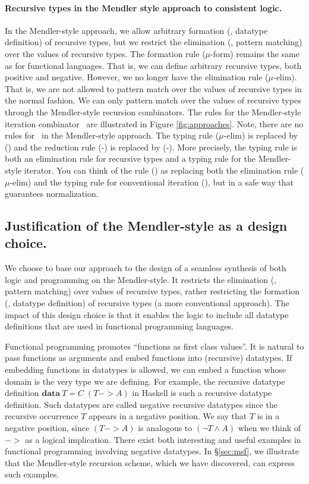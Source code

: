 \paragraph{Recursive types in the Mendler style approach to consistent logic.}
In the Mendler-style approach, we allow arbitrary formation
(\ie, datatype definition) of recursive types, but we restrict
the elimination (\ie, pattern matching) over the values of recursive types. 
The formation rule {\small($\mu$-form)} remains the same as
for functional languages. That is, we can define arbitrary recursive types,
both positive and negative. However, we no longer have the elimination
rule {\small($\mu$-elim)}. That is, we are not allowed to pattern match over
the values of recursive types in the normal fashion. We can only pattern match
over the values of recursive types through the Mendler-style recursion
combinators. The rules for the Mendler-style iteration combinator \MIt\
are illustrated in Figure \ref{fig:approaches}.
Note, there are no rules for \unIn\ in the Mendler-style approach.
The typing rule {\small($\mu$-elim)} is replaced by {\small(\MIt)} and
the reduction rule {\small(\unIn-\In)} is replaced by {\small(\MIt-\In)}.
More precisely, the typing rule {\small \MIt} is both an elimination rule
for recursive types and a typing rule for the Mendler-style iterator.
You can think of the rule {\small(\MIt)} as replacing both the elimination rule
{\small($\mu$-elim)} and the typing rule for conventional iteration
{\small(\It)}, but in a safe way that guarantees normalization.

\subsection{Justification of the Mendler-style as a design choice.}
\label{sec:intro:concepts:mendler}
We choose to base our approach to the design of a seamless synthesis of both
logic and programming on the Mendler-style. It restricts the elimination (\ie,
pattern matching) over values of recursive types, rather restricting the
formation (\ie, datatype definition) of recursive types (a more conventional
approach). The impact of this design choice is that it enables the logic to
include all datatype definitions that are used in functional programming
languages.

Functional programming promotes ``functions as first class values''.
It is natural to pass functions as arguments and embed functions into
(recursive) datatypes. If embedding functions in datatypes is allowed,
we can embed a function whose domain is the very type we are defining.
For example, the recursive datatype definition
$\mathbf{data}~T = C\;(T -> \textit{A})$ in Haskell is such a recursive
datatype definition. Such datatypes are called negative recursive datatypes
since the recursive occurrence $T$ appears in a negative position.
We say that $T$ is in a negative position, since $(T -> A)$ is analogous to
$(\neg T \land A)$ when we think of $->$ as a logical implication. There exist
both interesting and useful examples in functional programming involving
negative datatypes. In \S\ref{sec:msf}, we illustrate that
the Mendler-style recursion scheme, which we have discovered,
can express such examples.

